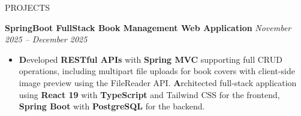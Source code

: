 \begin{rSection}{PROJECTS}
\begin{itemize}
\end{itemize}



\textbf{SpringBoot FullStack Book Management Web Application} \hfill 
\textit{November 2025 – December 2025}


\begin{itemize}
    \item 
    \textbf Developed \textbf{RESTful APIs} with \textbf{Spring MVC} supporting full CRUD operations, including multipart file uploads for book covers with client-side image preview using the FileReader API.
    \textbf Architected full-stack application using \textbf{React 19} with \textbf{TypeScript} and Tailwind CSS for the frontend,\textbf{ Spring Boot }with \textbf{PostgreSQL} for the backend.

\end{itemize}






\end{rSection} 
